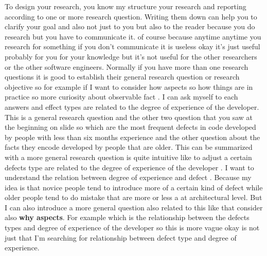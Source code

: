 \documentclass[conference, compsoc, twoside]{IEEEtran}
\begin{document}
To design your research, you know my structure your research and reporting according to one or more research question.
Writing them down can help you to clarify your goal and also not just to you but also to the reader because you do research but you have to communicate it.
of course because anytime anytime you research for something if you don't communicate it is useless okay it's just useful probably for you for your knowledge but it's not useful for the other researchers or the other software engineers. 
Normally if you have more than one research questions it is good to establish their general research question or research objective so for example if I want to consider how aspects so how things are in practice so more curiosity about observable fact .
I can ask myself to each answers and effect types are related to the degree of experience of the developer.
This is a general research question and the other two question that you saw at the beginning on slide so which are the most frequent defects in code developed by people with less than six months experience and the other question about the facts they encode developed by people that are older.
This can be summarized with a more general research question is quite intuitive like to adjust a certain defects type are related to the degree of experience of the developer .
I want to understand the relation between degree of experience and defect .
Because my idea is that novice people tend to introduce more of a certain kind of defect while older people tend to do mistake that are more or less a at architectural level. 
But I can also introduce a more general question also related to this like that consider also \textbf{why aspects}. For example which is the relationship between the defects types and degree of experience of the developer so this is more vague okay is not just that I'm searching for relationship between defect type and degree of experience. 
\end{document}

